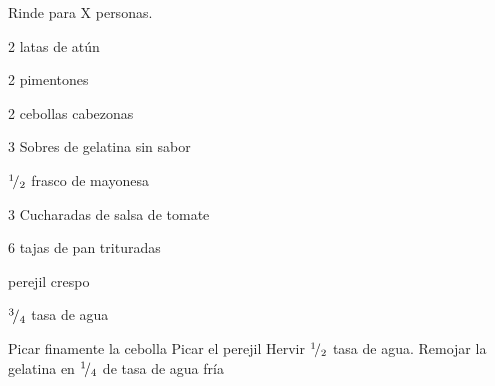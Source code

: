 
Rinde para X personas.


\begin{ingredientes}
\item 2 latas de atún
\item 2 pimentones
\item 2 cebollas cabezonas
\item 3 Sobres de gelatina sin sabor
\item ${}^{1}\!/_{2}$ frasco de mayonesa
\item 3 Cucharadas de salsa de tomate
\item 6 tajas de pan trituradas
\item perejil crespo
\item ${}^{3}\!/_{4}$ tasa de agua
\end{ingredientes}

Picar finamente la cebolla
Picar el perejil
Hervir ${}^{1}\!/_{2}$ tasa de agua.
Remojar la gelatina en ${}^{1}\!/_{4}$ de tasa de agua fría 

\preparacion


